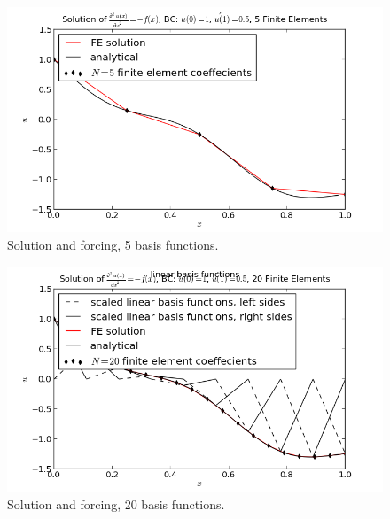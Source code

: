 \documentclass[10pt]{article}
\begin{document}
\begin{figure}[ht]
    \centering
    \includegraphics[width=\columnwidth,keepaspectratio=true]{./hw7-solution_and_forcing-N5.png}
    \caption{Solution and forcing, 5 basis functions.}
    \label{fig:sf5}
\end{figure}

\begin{figure}[ht]
    \centering
    \includegraphics[width=\columnwidth,keepaspectratio=true]{./hw7-solution_and_forcing-N20.png}
    \caption{Solution and forcing, 20 basis functions.}
    \label{fig:sf20}
\end{figure}
\end{document}
